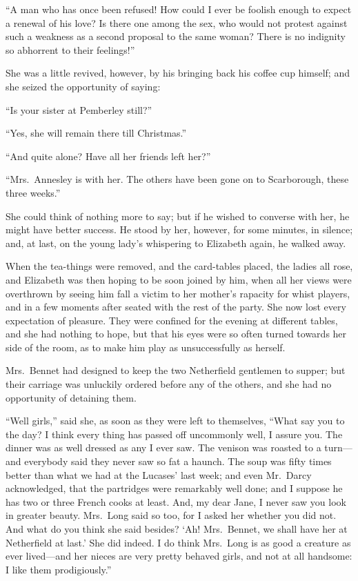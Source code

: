 \documentclass[12pt,english,oneside]{book}
\begin{document}
{}``A man who has once been refused! How could I ever be foolish
enough to expect a renewal of his love? Is there one among the sex,
who would not protest against such a weakness as a second proposal
to the same woman? There is no indignity so abhorrent to their feelings!''\ 

She was a little revived, however, by his bringing back his coffee
cup himself; and she seized the opportunity of saying:

{}``Is your sister at Pemberley still?''\ 

{}``Yes, she will remain there till Christmas.''

{}``And quite alone? Have all her friends left her?''\ 

{}``Mrs.\ Annesley is with her. The others have been gone on to
Scarborough, these three weeks.''

She could think of nothing more to say; but if he wished to converse
with her, he might have better success. He stood by her, however,
for some minutes, in silence; and, at last, on the young lady's whispering
to Elizabeth again, he walked away.

When the tea-things were removed, and the card-tables placed, the
ladies all rose, and Elizabeth was then hoping to be soon joined by
him, when all her views were overthrown by seeing him fall a victim
to her mother's rapacity for whist players, and in a few moments after
seated with the rest of the party. She now lost every expectation
of pleasure. They were confined for the evening at different tables,
and she had nothing to hope, but that his eyes were so often turned
towards her side of the room, as to make him play as unsuccessfully
as herself.

Mrs.\ Bennet had designed to keep the two Netherfield gentlemen to
supper; but their carriage was unluckily ordered before any of the
others, and she had no opportunity of detaining them.

{}``Well girls,'' said she, as soon as they were left to themselves,
{}``What say you to the day? I think every thing has passed off uncommonly
well, I assure you. The dinner was as well dressed as any I ever saw.
The venison was roasted to a turn\mbox{---}and everybody said they
never saw so fat a haunch. The soup was fifty times better than what
we had at the Lucases' last week; and even Mr.\ Darcy acknowledged,
that the partridges were remarkably well done; and I suppose he has
two or three French cooks at least. And, my dear Jane, I never saw
you look in greater beauty. Mrs.\ Long said so too, for I asked her
whether you did not. And what do you think she said besides? `Ah!
Mrs.\ Bennet, we shall have her at Netherfield at last.' She did
indeed. I do think Mrs.\ Long is as good a creature as ever lived\mbox{---}and
her nieces are very pretty behaved girls, and not at all handsome:
I like them prodigiously.''
\end{document}
